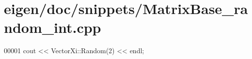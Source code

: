 \hypertarget{eigen_2doc_2snippets_2_matrix_base__random__int_8cpp_source}{}\section{eigen/doc/snippets/\+Matrix\+Base\+\_\+random\+\_\+int.cpp}
\label{eigen_2doc_2snippets_2_matrix_base__random__int_8cpp_source}

\begin{DoxyCode}
00001 cout << VectorXi::Random(2) << endl;
\end{DoxyCode}
